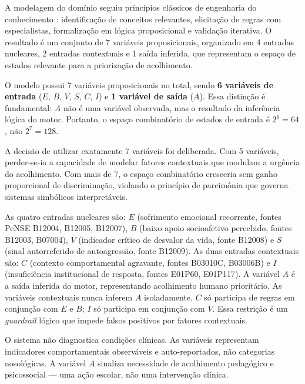 \documentclass[
    12pt,
    openright,
    oneside,
    a4paper,
    english,
    brazil
]{abntex2}
\begin{document}
A modelagem do dom\'inio seguiu princ\'ipios cl\'assicos de engenharia do conhecimento \cite{brachman_levesque_2004}: identifica\c{c}\~ao de conceitos relevantes, elicita\c{c}\~ao de regras com especialistas, formaliza\c{c}\~ao em l\'ogica proposicional e valida\c{c}\~ao iterativa. O resultado \'e um conjunto de 7 vari\'aveis proposicionais, organizado em 4 entradas nucleares, 2 entradas contextuais e 1 sa\'ida inferida, que representam o espa\c{c}o de estados relevante para a prioriza\c{c}\~ao de acolhimento.

O modelo possui 7 vari\'aveis proposicionais no total, sendo \textbf{6 vari\'aveis de entrada} ($E$, $B$, $V$, $S$, $C$, $I$) e \textbf{1 vari\'avel de sa\'ida} ($A$). Essa distin\c{c}\~ao \'e fundamental: $A$ n\~ao \'e uma vari\'avel observada, mas o resultado da infer\^encia l\'ogica do motor. Portanto, o espa\c{c}o combinat\'orio de estados de entrada \'e $2^6 = 64$, n\~ao $2^7 = 128$.

A decis\~ao de utilizar exatamente 7 vari\'aveis foi deliberada. Com 5 vari\'aveis, perder-se-ia a capacidade de modelar fatores contextuais que modulam a urg\^encia do acolhimento. Com mais de 7, o espa\c{c}o combinat\'orio cresceria sem ganho proporcional de discrimina\c{c}\~ao, violando o princ\'ipio de parcim\^onia que governa sistemas simb\'olicos interpret\'aveis.

As quatro entradas nucleares s\~ao: $E$ (sofrimento emocional recorrente, fontes PeNSE B12004, B12005, B12007), $B$ (baixo apoio socioafetivo percebido, fontes B12003, B07004), $V$ (indicador cr\'itico de desvalor da vida, fonte B12008) e $S$ (sinal autorreferido de autoagress\~ao, fonte B12009). As duas entradas contextuais s\~ao: $C$ (contexto comportamental agravante, fontes B03010C, B03006B) e $I$ (insufici\^encia institucional de resposta, fontes E01P60, E01P117). A vari\'avel $A$ \'e a sa\'ida inferida do motor, representando acolhimento humano priorit\'ario. As vari\'aveis contextuais nunca inferem $A$ isoladamente. $C$ s\'o participa de regras em conjun\c{c}\~ao com $E$ e $B$; $I$ s\'o participa em conjun\c{c}\~ao com $V$. Essa restri\c{c}\~ao \'e um \textit{guardrail} l\'ogico que impede falsos positivos por fatores contextuais.

O sistema n\~ao diagnostica condi\c{c}\~oes cl\'inicas. As vari\'aveis representam indicadores comportamentais observ\'aveis e auto-reportados, n\~ao categorias nosol\'ogicas. A vari\'avel $A$ sinaliza necessidade de acolhimento pedag\'ogico e psicossocial --- uma a\c{c}\~ao escolar, n\~ao uma interven\c{c}\~ao cl\'inica.
\end{document}
